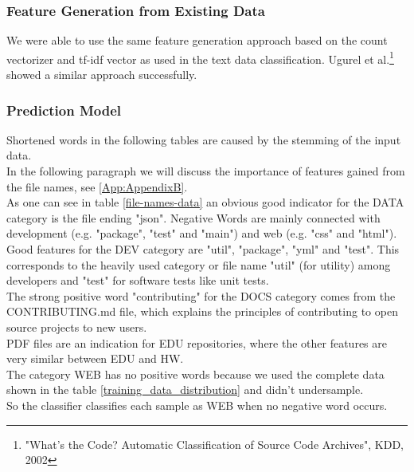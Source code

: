 \documentclass[%
a4paper,
DIV12,
2.5headlines,
bigheadings,
titlepage,
openbib,
]{scrartcl}
\begin{document}
\subsubsection{Feature Generation from Existing
Data}\label{feature-generation-from-existing-data-1}

We were able to use the same feature generation approach based on the count vectorizer and tf-idf vector as used in the text data classification.
Ugurel et al.\footnote{"What's the Code? Automatic Classification of Source Code Archives", KDD, 2002} showed a similar approach successfully.

\subsubsection{Prediction Model}\label{prediction-model-2}

Shortened words in the following tables are caused by the stemming of the input data.\\

In the following paragraph we will discuss the importance of features gained from the file names, see \ref{App:AppendixB}. \\
As one can see in table \ref{file-names-data} an obvious good indicator for the DATA category is the file ending "json".
Negative Words are mainly connected with development (e.g. "package", "test" and "main") and web (e.g. "css" and "html").\\
Good features for the DEV category are "util", "package", "yml" and "test".
This corresponds to the heavily used category or file name "util" (for utility) among developers and "test" for software tests like unit tests. \\
The strong positive word "contributing" for the DOCS category comes from the CONTRIBUTING.md file, which explains the principles of contributing to open source projects to new users.\\
PDF files are an indication for EDU repositories, where the other features are very similar between EDU and HW.\\
The category WEB has no positive words because we used the complete data shown in the table \ref{training_data_distribution} and didn't undersample.\\
So the classifier classifies each sample as WEB when no negative word occurs.\\
\end{document}
